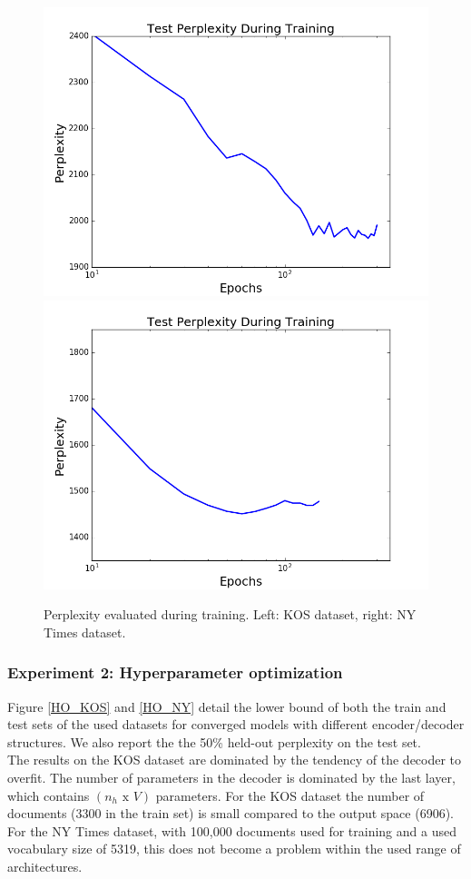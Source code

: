 \documentclass{report}
\begin{document}
	\begin{figure}
		\includegraphics[scale = 0.40]{img/kos_200_0_perp.png}
		\includegraphics[scale = 0.40]{img/ny_400_50_perp.png}
		\caption{Perplexity evaluated during training. Left: KOS dataset, right: NY Times dataset.}
		\label{perp_first}
	\end{figure}
	
	\subsubsection{Experiment 2: Hyperparameter optimization}\label{ho}
	
	Figure \ref{HO_KOS} and \ref{HO_NY} detail the lower bound of both the train and test sets of the used datasets for converged models with different encoder/decoder structures. We also report the the 50\% held-out perplexity on the test set.\\
	The results on the KOS dataset are dominated by the tendency of the decoder to overfit. The number of parameters in the decoder is dominated by the last layer, which contains $(n_h \text{ x } V)$ parameters. For the KOS dataset the number of documents (3300 in the train set) is small compared to the output space (6906). For the NY Times dataset, with 100,000 documents used for training and a used vocabulary size of 5319, this does not become a problem within the used range of architectures.  
	
\end{document}
